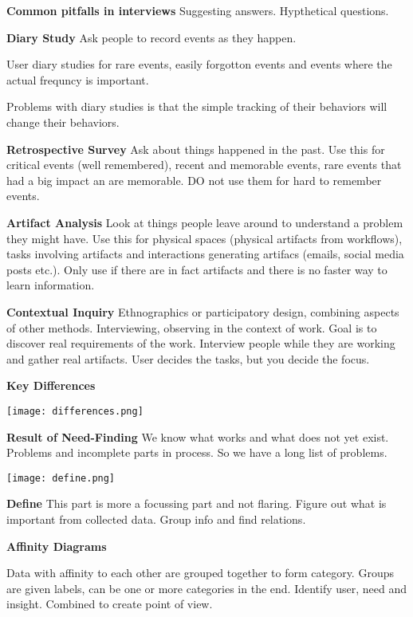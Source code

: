 \textbf{Common pitfalls in interviews}
Suggesting answers. Hypthetical questions. \medskip

\textbf{Diary Study}
Ask people to record events as they happen. 

User diary studies for rare events, easily forgotton events and events where the actual frequncy is important. 

Problems with diary studies is that the simple tracking of their behaviors will change their behaviors. \medskip

\textbf{Retrospective Survey}
Ask about things happened in the past. Use this for critical events (well remembered), recent and memorable events, rare events that had a big impact an are memorable. DO not use them for hard to remember events.\medskip

\textbf{Artifact Analysis}
Look at things people leave around to understand a problem they might have. Use this for physical spaces (physical artifacts from workflows), tasks involving artifacts and interactions generating artifacs (emails, social media posts etc.).
Only use if there are in fact artifacts and there is no faster way to learn information. \medskip

\textbf{Contextual Inquiry}
Ethnographics or participatory design, combining aspects of other methods. Interviewing, observing in the context of work. Goal is to discover real requirements of the work.
Interview people while they are working and gather real artifacts. User decides the tasks, but you decide the focus. \medskip

\textbf{Key Differences}


\begin{center}
	\texttt{[image: differences.png]}
\end{center}

\textbf{Result of Need-Finding}
We know what works and what does not yet exist. Problems and incomplete parts in process. So we have a long list of problems. 


\begin{center}
	\texttt{[image: define.png]}
\end{center}

\textbf{Define}
This part is more a focussing part and not flaring. Figure out what is important from collected data. Group info and find relations. \medskip

\textbf{Affinity Diagrams}

Data with affinity to each other are grouped together to form category. Groups are given labels, can be one or more categories in the end. 
Identify user, need and insight. Combined to create point of view. 

